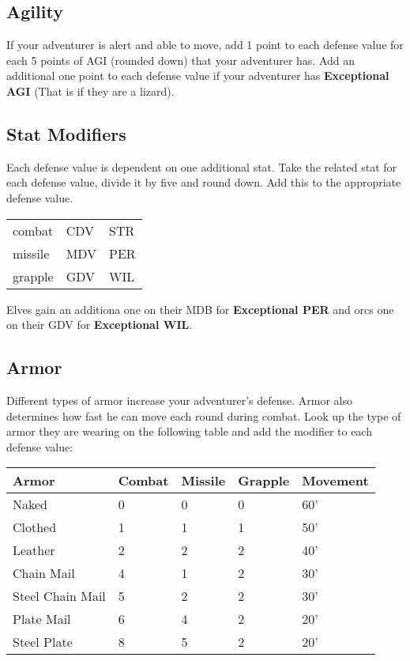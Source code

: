 \begin{multicols*}{2}
\subsection{Agility}
If your adventurer is alert and able to move, add 1 point to each defense value for each 5 points of AGI (rounded down) that your adventurer has. Add an additional one point to each defense value if your adventurer has \textbf{Exceptional AGI} (That is if they are a lizard).
\subsection{Stat Modifiers}
Each defense value is dependent on one additional stat. Take the related stat for each defense value, divide it by five and round down. Add this to the appropriate defense value.

\begin{tabular}{@{}l l l}
combat & CDV & STR\\
missile & MDV & PER\\
grapple & GDV & WIL\\
\end{tabular}

Elves gain an additiona one on their MDB for \textbf{Exceptional PER} and orcs one on their GDV for \textbf{Exceptional WIL}.
\subsection{Armor}
Different types of armor increase your adventurer’s defense. Armor also determines how fast he can move each round during combat. Look up the type of armor they are wearing on the following table and add the modifier to each defense value:
\begin{tcolorbox}[breakable,boxrule=0pt]
\begin{tabular}{@{}l l l l l}
\textbf{Armor} & \textbf{Combat} & \textbf{Missile} & \textbf{Grapple} & \textbf{Movement}\\
\midrule
Naked & 0 & 0 & 0 & 60’\\
Clothed & 1 & 1 & 1 & 50’\\
Leather & 2 & 2 & 2 & 40’\\
Chain Mail & 4 & 1 & 2 & 30’\\
Steel Chain Mail  & 5 & 2 & 2 & 30’\\
Plate Mail & 6 & 4 & 2 & 20’\\
Steel Plate & 8 & 5 & 2 & 20’\\
\end{tabular}
\end{tcolorbox}

\end{multicols*}
